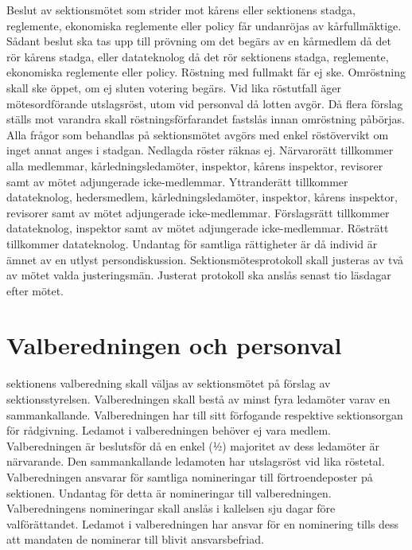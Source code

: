 \documentclass[a4paper]{dtek}
\begin{document}
\para[Överklagande] Beslut av sektionsmötet som strider mot kårens eller sektionens stadga, reglemente, ekonomiska reglemente eller policy får undanröjas av kårfullmäktige.
\stycke Sådant beslut ska tas upp till prövning om det begärs av en kårmedlem då det rör kårens stadga, eller datateknolog då det rör sektionens stadga, reglemente, ekonomiska reglemente eller policy.
\para[Omröstning] Röstning med fullmakt får ej ske.
\para Omröstning skall ske öppet, om ej sluten votering begärs.
\para Vid lika röstutfall äger mötesordförande utslagsröst, utom vid personval då lotten avgör.
\para Då flera förslag ställs mot varandra skall röstningsförfarandet fastslås innan omröstning påbörjas.
\para Alla frågor som behandlas på sektionsmötet avgörs med enkel röstövervikt om inget annat anges i stadgan. Nedlagda röster räknas ej.
\para[Rättigheter] Närvarorätt tillkommer alla medlemmar, kårledningsledamöter, inspektor, kårens inspektor, revisorer samt av mötet adjungerade icke-medlemmar.
\para Yttranderätt tillkommer datateknolog, hedersmedlem, kårledningsledamöter, inspektor, kårens inspektor, revisorer samt av mötet adjungerade icke-medlemmar.
\para Förslagsrätt tillkommer datateknolog, inspektor samt av mötet adjungerade icke-medlemmar.
\para Rösträtt tillkommer datateknolog.
\para[Persondiskussion] Undantag för samtliga rättigheter är då individ är ämnet av en utlyst persondiskussion. 
\para[Protokoll] Sektionsmötesprotokoll skall justeras av två av mötet valda justeringsmän. Justerat protokoll ska anslås senast tio läsdagar efter mötet.

\section{Valberedningen och personval}
\para[Sammansättning] sektionens valberedning skall väljas av sektionsmötet på förslag av sektionsstyrelsen.
\para Valberedningen skall bestå av minst fyra ledamöter varav en sammankallande.
\para Valberedningen har till sitt förfogande respektive sektionsorgan för rådgivning.
\para Ledamot i valberedningen behöver ej vara medlem.
\para[Beslutsförhet] Valberedningen är beslutsför då en enkel (1⁄2) majoritet av dess ledamöter är närvarande.
\para Den sammankallande ledamoten har utslagsröst vid lika röstetal.
\para[Åligganden] Valberedningen ansvarar för samtliga nomineringar till förtroendeposter på sektionen.
\stycke Undantag för detta är nomineringar till valberedningen.
\para Valberedningens nomineringar skall anslås i kallelsen sju dagar före valförättandet.
\para Ledamot i valberedningen har ansvar för en nominering tills dess att mandaten de nominerar till blivit ansvarsbefriad. 
\end{document}
